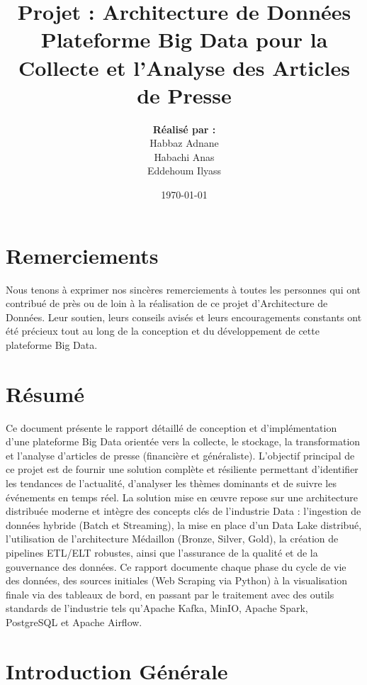 \documentclass[12pt,a4paper]{report}
\title{
    \vspace{2cm}
    \Huge\textbf{Projet : Architecture de Données}\\
    \vspace{1cm}
    \Large Plateforme Big Data pour la Collecte et l'Analyse des Articles de Presse
    \vspace{3cm}
}
\author{
    \Large \textbf{Réalisé par :} \\
    \Large Habbaz Adnane \\
    \Large Habachi Anas \\
    \Large Eddehoum Ilyass
}
\date{\vspace{2cm}\today}
\begin{document}
\maketitle

\chapter*{Remerciements}
Nous tenons à exprimer nos sincères remerciements à toutes les personnes qui ont contribué de près ou de loin à la réalisation de ce projet d'Architecture de Données. Leur soutien, leurs conseils avisés et leurs encouragements constants ont été précieux tout au long de la conception et du développement de cette plateforme Big Data.

\chapter*{Résumé}
Ce document présente le rapport détaillé de conception et d'implémentation d'une plateforme Big Data orientée vers la collecte, le stockage, la transformation et l'analyse d'articles de presse (financière et généraliste). L'objectif principal de ce projet est de fournir une solution complète et résiliente permettant d'identifier les tendances de l'actualité, d'analyser les thèmes dominants et de suivre les événements en temps réel. La solution mise en œuvre repose sur une architecture distribuée moderne et intègre des concepts clés de l'industrie Data : l'ingestion de données hybride (Batch et Streaming), la mise en place d'un Data Lake distribué, l'utilisation de l'architecture Médaillon (Bronze, Silver, Gold), la création de pipelines ETL/ELT robustes, ainsi que l'assurance de la qualité et de la gouvernance des données. Ce rapport documente chaque phase du cycle de vie des données, des sources initiales (Web Scraping via Python) à la visualisation finale via des tableaux de bord, en passant par le traitement avec des outils standards de l'industrie tels qu'Apache Kafka, MinIO, Apache Spark, PostgreSQL et Apache Airflow.

\tableofcontents
\listoffigures

\chapter{Introduction Générale}
\end{document}
